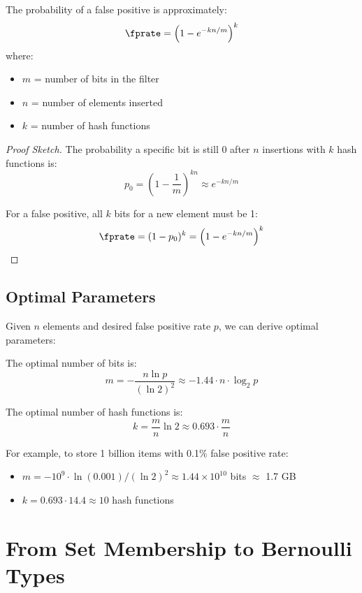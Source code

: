 \begin{theorem}
The probability of a false positive is approximately:
\[
\fprate = \left(1 - e^{-kn/m}\right)^k
\]
where:
\begin{itemize}
\item $m$ = number of bits in the filter
\item $n$ = number of elements inserted
\item $k$ = number of hash functions
\end{itemize}
\end{theorem}

\begin{proof}[Proof Sketch]
The probability a specific bit is still 0 after $n$ insertions with $k$ hash functions is:
\[
p_0 = \left(1 - \frac{1}{m}\right)^{kn} \approx e^{-kn/m}
\]

For a false positive, all $k$ bits for a new element must be 1:
\[
\fprate = (1 - p_0)^k = \left(1 - e^{-kn/m}\right)^k
\]
\end{proof}

\subsection{Optimal Parameters}

Given $n$ elements and desired false positive rate $p$, we can derive optimal parameters:

\begin{theorem}
The optimal number of bits is:
\[
m = -\frac{n \ln p}{(\ln 2)^2} \approx -1.44 \cdot n \cdot \log_2 p
\]

The optimal number of hash functions is:
\[
k = \frac{m}{n} \ln 2 \approx 0.693 \cdot \frac{m}{n}
\]
\end{theorem}

For example, to store 1 billion items with 0.1\% false positive rate:
\begin{itemize}
\item $m = -10^9 \cdot \ln(0.001) / (\ln 2)^2 \approx 1.44 \times 10^{10}$ bits $\approx$ 1.7 GB
\item $k = 0.693 \cdot 14.4 \approx 10$ hash functions
\end{itemize}

\section{From Set Membership to Bernoulli Types}

